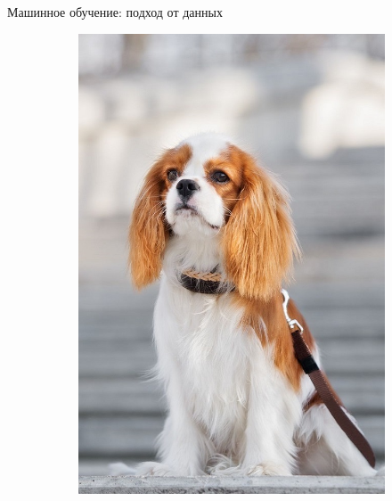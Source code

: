 \documentclass[aspectratio=169]{beamer}
\begin{document}
\begin{frame}{Машинное обучение: подход от данных}
\begin{figure}
\begin{subfigure}[b]{.1\linewidth}
        \end{subfigure}
        \begin{subfigure}[b]{.1\linewidth}
            \includegraphics[width=\linewidth]{graphs/fig14_1.jpg}
        \end{subfigure}
        \begin{subfigure}[b]{.1\linewidth}

\end{subfigure}
\end{figure}
\end{frame}
\end{document}
